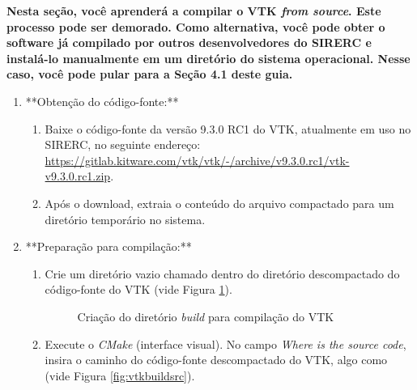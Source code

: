\documentclass[a4paper,11pt]{article}
\newcommand{\sistema}{\textsf{SIRERC}}
\newcommand{\cmake}{\textit{CMake}}
\newcommand{\build}{\textit{build}}
\newcommand{\cautionbox}[1]{
	\vskip 5mm
	\begin{leftbar}
		\textbf{#1}
	\end{leftbar}
	\vskip 5mm
}
\begin{document}
\cautionbox{
	Nesta seção, você aprenderá a compilar o VTK \emph{from source}. Este processo pode ser demorado. Como alternativa, você pode obter o software já compilado por outros desenvolvedores do \sistema{} e instalá-lo manualmente em um diretório do sistema operacional. Nesse caso, você pode pular para a Seção 4.1 deste guia.
}

\begin{enumerate}
	\item **Obtenção do código-fonte:**
	\begin{enumerate}
		\item Baixe o código-fonte da versão 9.3.0 RC1 do VTK, atualmente em uso no \sistema{}, no seguinte endereço: \url{https://gitlab.kitware.com/vtk/vtk/-/archive/v9.3.0.rc1/vtk-v9.3.0.rc1.zip}.
		\item Após o download, extraia o conteúdo do arquivo compactado para um diretório temporário no sistema.
	\end{enumerate}
	
	\item **Preparação para compilação:**
	\begin{enumerate}
		\item Crie um diretório vazio chamado  dentro do diretório descompactado do código-fonte do VTK (vide Figura \ref{fig:vtkbuilddir}).
		
		\begin{figure}[H]\centering
			\caption{Criação do diretório \build{} para compilação do VTK}\label{fig:vtkbuilddir}
		\end{figure}
		
		\item Execute o \cmake{} (interface visual). No campo \emph{Where is the source code}, insira o caminho do código-fonte descompactado do VTK, algo como  (vide Figura \ref{fig:vtkbuildsrc}).
		

\end{enumerate}
\end{enumerate}
\end{document}
